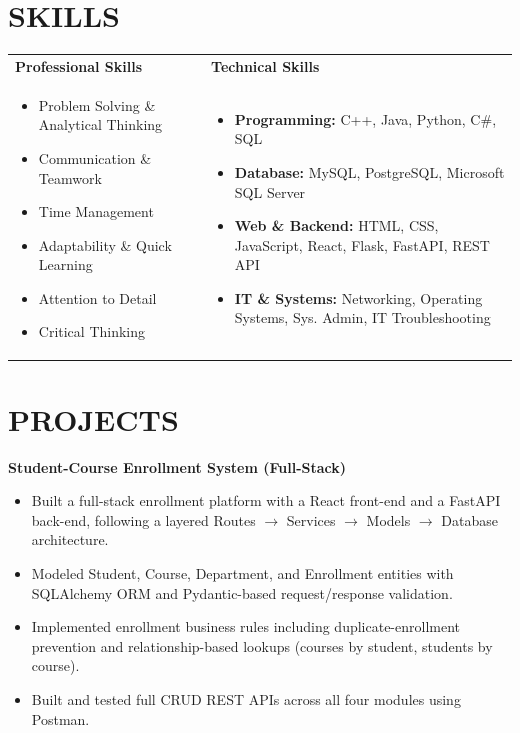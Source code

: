 \documentclass[9pt]{article}
\newenvironment{tightlist}{\begin{itemize}[leftmargin=13pt, itemsep=0pt, topsep=0pt, parsep=0pt]}{\end{itemize}}
\begin{document}
\section*{SKILLS}
\begin{tabularx}{\linewidth}{@{}X X@{}}
\textbf{Professional Skills} &
\textbf{Technical Skills} \\[2pt]
\begin{minipage}[t]{\linewidth}
\begin{tightlist}
  \item Problem Solving \& Analytical Thinking
  \item Communication \& Teamwork
  \item Time Management
  \item Adaptability \& Quick Learning
  \item Attention to Detail
  \item Critical Thinking
\end{tightlist}
\end{minipage}
&
\begin{minipage}[t]{\linewidth}
\begin{tightlist}
  \item \textbf{Programming:} C++, Java, Python, C\#, SQL
  \item \textbf{Database:} MySQL, PostgreSQL, Microsoft SQL Server
  \item \textbf{Web \& Backend:} HTML, CSS, JavaScript, React, Flask, FastAPI, REST API
  \item \textbf{IT \& Systems:} Networking, Operating Systems, Sys. Admin, IT Troubleshooting
\end{tightlist}
\end{minipage} \\
\end{tabularx}

\section*{PROJECTS}

\textbf{Student-Course Enrollment System (Full-Stack)}
\begin{tightlist}
  \item Built a full-stack enrollment platform with a React front-end and a FastAPI back-end, following a layered Routes $\rightarrow$ Services $\rightarrow$ Models $\rightarrow$ Database architecture.
  \item Modeled Student, Course, Department, and Enrollment entities with SQLAlchemy ORM and Pydantic-based request/response validation.
  \item Implemented enrollment business rules including duplicate-enrollment prevention and relationship-based lookups (courses by student, students by course).
  \item Built and tested full CRUD REST APIs across all four modules using Postman.
\end{tightlist}
\end{document}

